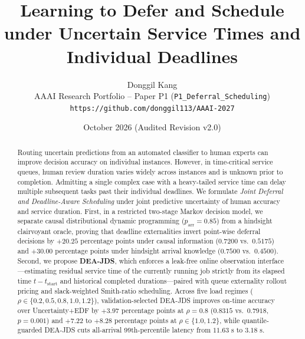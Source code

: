 \documentclass[10pt,twocolumn,letterpaper]{article}
\title{\textbf{Learning to Defer and Schedule under Uncertain Service Times and Individual Deadlines}}
\author{Donggil Kang\\
AAAI Research Portfolio -- Paper P1 (\texttt{P1\_Deferral\_Scheduling})\\
\texttt{https://github.com/donggil113/AAAI-2027}}
\date{October 2026 (Audited Revision v2.0)}
\begin{document}
\maketitle

\begin{abstract}
Routing uncertain predictions from an automated classifier to human experts can improve decision accuracy on individual instances. However, in time-critical service queues, human review duration varies widely across instances and is unknown prior to completion. Admitting a single complex case with a heavy-tailed service time can delay multiple subsequent tasks past their individual deadlines. We formulate \emph{Joint Deferral and Deadline-Aware Scheduling} under joint predictive uncertainty of human accuracy and service duration. First, in a restricted two-stage Markov decision model, we separate causal distributional dynamic programming ($p_{\text{arr}}=0.85$) from a hindsight clairvoyant oracle, proving that deadline externalities invert point-wise deferral decisions by $+20.25$ percentage points under causal information ($0.7200$ vs.\ $0.5175$) and $+30.00$ percentage points under hindsight arrival knowledge ($0.7500$ vs.\ $0.4500$). Second, we propose \textbf{DEA-JDS}, which enforces a leak-free online observation interface---estimating residual service time of the currently running job strictly from its elapsed time $t - t_{\text{start}}$ and historical completed durations---paired with queue externality rollout pricing and slack-weighted Smith-ratio scheduling. Across five load regimes ($\rho \in \{0.2, 0.5, 0.8, 1.0, 1.2\}$), validation-selected DEA-JDS improves on-time accuracy over Uncertainty+EDF by $+3.97$ percentage points at $\rho=0.8$ ($0.8315$ vs.\ $0.7918$, $p=0.001$) and $+7.22$ to $+8.28$ percentage points at $\rho \in \{1.0, 1.2\}$, while quantile-guarded DEA-JDS cuts all-arrival 99th-percentile latency from $11.63\text{ s}$ to $3.18\text{ s}$.
\end{abstract}
\end{document}
